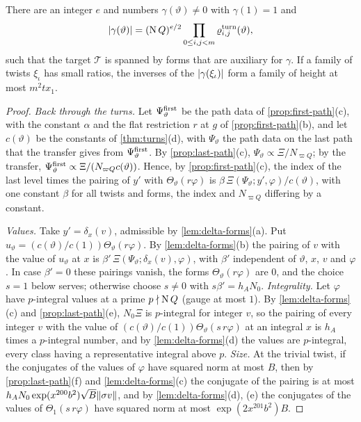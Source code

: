 \begin{theorem}\label{thm:auxiliary-forms}
There are an integer $e$ and numbers $\gamma(\vartheta)\ne0$ with $\gamma(1)=1$ and
\[
  \lvert \gamma(\vartheta)\rvert=(\operatorname{N} Q)^{e/2}\prod_{0\le i,j<m}\varrho^{\rm turn}_{i,j}(\vartheta),
\]
such that the target $\mathcal T$ is spanned by forms that are auxiliary for $\gamma$. If a family of twists $\xi_\iota$ has small ratios, the inverses of the $\lvert \gamma(\xi_\iota)\rvert$ form a family of height at most $m^2tx_1$.
\end{theorem}

\begin{proof}
\emph{Back through the turns.} Let $\Psi^{\rm first}_\vartheta$ be the path data of \cref{prop:first-path}(c), with the constant $\alpha$ and the flat restriction $r$ at $g$ of \cref{prop:first-path}(b), and let $c(\vartheta)$ be the constants of
\cref{thm:turns}(d), with $\Psi_\vartheta$ the path data on the last path that the transfer gives from $\Psi^{\rm first}_\vartheta$. By \cref{prop:last-path}(c), $\Psi_\vartheta\propto\Xi/N_{\varpi Q}$; by the transfer, $\Psi^{\rm first}_\vartheta\propto\Xi/(N_{\varpi Q}c(\vartheta))$. Hence, by
\cref{prop:first-path}(c), the index of the last level times the pairing of $y'$ with $\Theta_\vartheta(r\varphi)$ is $\beta\,\Xi(\Psi_\vartheta;y',\varphi)/c(\vartheta)$, with one constant $\beta$ for all twists and forms, the index and $N_{\varpi Q}$ differing by a constant.

\emph{Values.} Take $y'=\delta_x(v)$, admissible by \cref{lem:delta-forms}(a). Put $u_\vartheta=(c(\vartheta)/c(1))\Theta_\vartheta(r\varphi)$. By \cref{lem:delta-forms}(b) the pairing of $v$ with the value of
$u_\vartheta$ at $x$ is $\beta'\,\Xi(\Psi_\vartheta;\delta_x(v),\varphi)$, with $\beta'$ independent of $\vartheta$, $x$, $v$ and $\varphi$. In case $\beta'=0$ these pairings vanish, the forms $\Theta_\vartheta(r\varphi)$ are $0$, and the choice $s=1$ below serves; otherwise choose $s\ne0$ with $s\beta'=h_AN_0$.
\emph{Integrality.} Let $\varphi$ have $p$-integral values at a prime $p\nmid\operatorname{N} Q$ (gauge at most $1$). By \cref{lem:delta-forms}(c) and \cref{prop:last-path}(e), $N_0\Xi$ is $p$-integral for integer $v$, so the pairing of every integer $v$ with the
value of $(c(\vartheta)/c(1))\Theta_\vartheta(s\,r\varphi)$ at an integral $x$ is $h_A$ times a $p$-integral number, and by \cref{lem:delta-forms}(d) the values are $p$-integral, every class having a representative integral above $p$. \emph{Size.} At the trivial twist, if the
conjugates of the values of $\varphi$ have squared norm at most $B$, then by \cref{prop:last-path}(f) and \cref{lem:delta-forms}(c) the conjugate of the pairing is at most $h_AN_0\exp(x^{200}b^2)\sqrt B\lVert \sigma v\rVert$, and by \cref{lem:delta-forms}(d), (e)
the conjugates of the values of $\Theta_1(s\,r\varphi)$ have squared norm at most $\exp(2x^{201}b^2)B$.


\end{proof}

